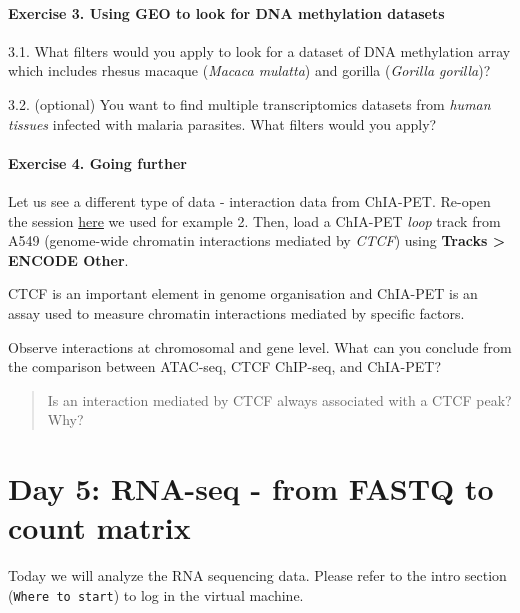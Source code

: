 \documentclass[
]{book}
\begin{document}
\hypertarget{exercise-3.-using-geo-to-look-for-dna-methylation-datasets}{%
\paragraph{Exercise 3. Using GEO to look for DNA methylation datasets}\label{exercise-3.-using-geo-to-look-for-dna-methylation-datasets}}

3.1. What filters would you apply to look for a dataset of DNA methylation array which includes rhesus macaque (\emph{Macaca mulatta}) and gorilla (\emph{Gorilla gorilla})?

3.2. (optional) You want to find multiple transcriptomics datasets from \emph{human tissues} infected with malaria parasites. What filters would you apply?

\hypertarget{exercise-4.-going-further}{%
\paragraph{Exercise 4. Going further}\label{exercise-4.-going-further}}

Let us see a different type of data - interaction data from ChIA-PET. Re-open the session \href{IGV_sessions/ExampleATAC_ChIP_CTCF_hg38.json}{here} we used for example 2. Then, load a ChIA-PET \emph{loop} track from A549 (genome-wide chromatin interactions mediated by \emph{CTCF}) using \textbf{Tracks \textgreater{} ENCODE Other}.

CTCF is an important element in genome organisation and ChIA-PET is an assay used to measure chromatin interactions mediated by specific factors.

Observe interactions at chromosomal and gene level. What can you conclude from the comparison between ATAC-seq, CTCF ChIP-seq, and ChIA-PET?

\begin{quote}
Is an interaction mediated by CTCF always associated with a CTCF peak? Why?
\end{quote}

\hypertarget{day-5-rna-seq---from-fastq-to-count-matrix}{%
\section{Day 5: RNA-seq - from FASTQ to count matrix}\label{day-5-rna-seq---from-fastq-to-count-matrix}}

Today we will analyze the RNA sequencing data. Please refer to the intro section (\texttt{Where\ to\ start}) to log in the virtual machine.
\end{document}
